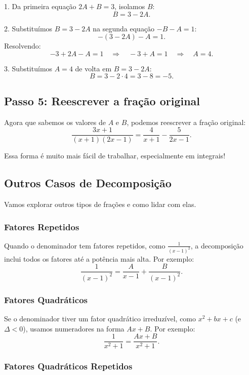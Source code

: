 \documentclass[a4paper,12pt]{article}  %
\begin{document}
1. Da primeira equação \( 2A + B = 3 \), isolamos \( B \):
\[
B = 3 - 2A.
\]

2. Substituímos \( B = 3 - 2A \) na segunda equação \( -B - A = 1 \):
\[
-(3 - 2A) - A = 1.
\]
Resolvendo:
\[
-3 + 2A - A = 1 \quad \Rightarrow \quad -3 + A = 1 \quad \Rightarrow \quad A = 4.
\]

3. Substituímos \( A = 4 \) de volta em \( B = 3 - 2A \):
\[
B = 3 - 2 \cdot 4 = 3 - 8 = -5.
\]

\subsection{Passo 5: Reescrever a fração original}

Agora que sabemos os valores de \( A \) e \( B \), podemos reescrever a fração original:
\[
\frac{3x + 1}{(x+1)(2x-1)} = \frac{4}{x+1} - \frac{5}{2x-1}.
\]

Essa forma é muito mais fácil de trabalhar, especialmente em integrais!

\subsection{Outros Casos de Decomposição}

Vamos explorar outros tipos de frações e como lidar com elas.

\subsubsection{Fatores Repetidos}

Quando o denominador tem fatores repetidos, como \( \frac{1}{(x-1)^2} \), a decomposição inclui todos os fatores até a potência mais alta. Por exemplo:
\[
\frac{1}{(x-1)^2} = \frac{A}{x-1} + \frac{B}{(x-1)^2}.
\]

\subsubsection{Fatores Quadráticos}

Se o denominador tiver um fator quadrático irreduzível, como \( x^2 + bx + c \) (e \( \Delta < 0 \)), usamos numeradores na forma \( Ax + B \). Por exemplo:
\[
\frac{1}{x^2 + 1} = \frac{Ax + B}{x^2 + 1}.
\]

\subsubsection{Fatores Quadráticos Repetidos}
\end{document}
